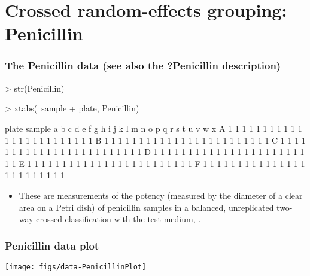 \section[Penicillin]{Crossed random-effects grouping: Penicillin}
\begin{frame}[fragile]
  \frametitle{The Penicillin data (see also the ?Penicillin description)}
\begin{Schunk}
\begin{Sinput}
> str(Penicillin)
\end{Sinput}
\begin{Sinput}
> xtabs(~sample + plate, Penicillin)
\end{Sinput}
\begin{Soutput}
      plate
sample a b c d e f g h i j k l m n o p q r s t u v w x
     A 1 1 1 1 1 1 1 1 1 1 1 1 1 1 1 1 1 1 1 1 1 1 1 1
     B 1 1 1 1 1 1 1 1 1 1 1 1 1 1 1 1 1 1 1 1 1 1 1 1
     C 1 1 1 1 1 1 1 1 1 1 1 1 1 1 1 1 1 1 1 1 1 1 1 1
     D 1 1 1 1 1 1 1 1 1 1 1 1 1 1 1 1 1 1 1 1 1 1 1 1
     E 1 1 1 1 1 1 1 1 1 1 1 1 1 1 1 1 1 1 1 1 1 1 1 1
     F 1 1 1 1 1 1 1 1 1 1 1 1 1 1 1 1 1 1 1 1 1 1 1 1
\end{Soutput}
\end{Schunk}
\begin{itemize}
\item These are measurements of the potency (measured by the diameter
  of a clear area on a Petri dish) of penicillin samples in a
  balanced, unreplicated two-way crossed classification with the test
  medium, .
\end{itemize}
\end{frame}

\begin{frame}[fragile]
  \frametitle{Penicillin data plot}
  \begin{center}
\texttt{[image: figs/data-PenicillinPlot]}
  \end{center}
\end{frame}


